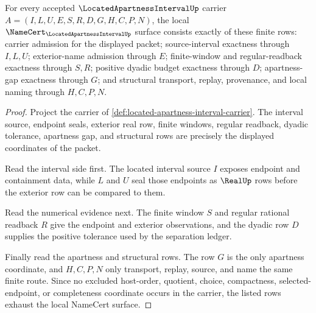 \begin{theorem}
\label{thm:located-apartness-interval-namecert-obligations}
For every accepted $\LocatedApartnessIntervalUp$ carrier $A=(I,L,U,E,S,R,D,G,H,C,P,N)$, the local $\NameCert_{\LocatedApartnessIntervalUp}$ surface consists exactly of these finite rows: carrier admission for the displayed packet; source-interval exactness through $I,L,U$; exterior-name admission through $E$; finite-window and regular-readback exactness through $S,R$; positive dyadic budget exactness through $D$; apartness-gap exactness through $G$; and structural transport, replay, provenance, and local naming through $H,C,P,N$.
\end{theorem}
\begin{proof}
Project the carrier of \autoref{def:located-apartness-interval-carrier}. The interval source, endpoint seals, exterior real row, finite windows, regular readback, dyadic tolerance, apartness gap, and structural rows are precisely the displayed coordinates of the packet.

Read the interval side first. The located interval source $I$ exposes endpoint and containment data, while $L$ and $U$ seal those endpoints as $\RealUp$ rows before the exterior row can be compared to them.

Read the numerical evidence next. The finite window $S$ and regular rational readback $R$ give the endpoint and exterior observations, and the dyadic row $D$ supplies the positive tolerance used by the separation ledger.

Finally read the apartness and structural rows. The row $G$ is the only apartness coordinate, and $H,C,P,N$ only transport, replay, source, and name the same finite route. Since no excluded host-order, quotient, choice, compactness, selected-endpoint, or completeness coordinate occurs in the carrier, the listed rows exhaust the local NameCert surface.
\end{proof}

